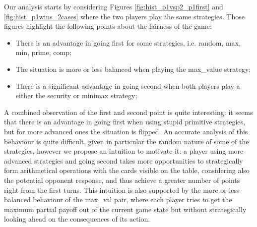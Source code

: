 
 Our analysis starts by considering Figures \ref{fig:hist_p1vsp2_p1first} and \ref{fig:hist_p1wins_2cases} where the two players play the same strategies.
 Those figures highlight the following points about the fairness of the game:
 \begin{itemize}
 	\item There is an advantage in going first for some strategies, i.e. random, max, min, prime, comp;
 	\item The situation is more or less balanced when playing the max\_value strategy;
 	\item There is a significant advantage in going second when both players play a either the security or minimax strategy;
 \end{itemize}
 A combined observation of the first and second point is quite interesting: it seems that there is an advantage in going first when using stupid primitive strategies, but for more advanced ones the situation is flipped. An accurate analysis of this behaviour is quite difficult, given in particular the random nature of some of the strategies, however we propose an intuition to motivate it: a player using more advanced strategies and going second takes more opportunities to strategically form arithmetical operations with the cards visible on the table, considering also the potential opponent response, and thus achieve a greater number of points right from the first turns. This intuition is also supported by the more or less balanced behaviour of the max\_val pair, where each player tries to get the maximum partial payoff out of the current game state but without strategically looking ahead on the consequences of its action.

